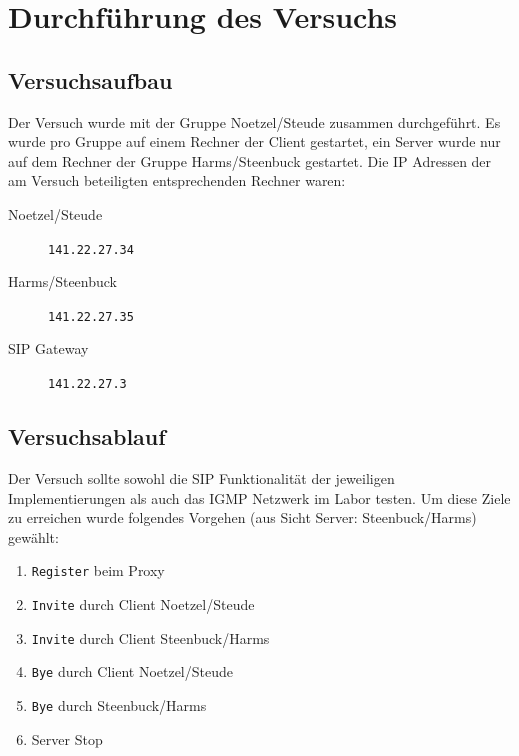 \documentclass[10pt]{scrartcl}
\author{André Harms, Oliver Steenbuck}
\title{\titletext}
\date{04.01.2012}
\begin{document}
\maketitle

\setcounter{tocdepth}{3}
\tableofcontents


\section{Durchführung des Versuchs}

\subsection{Versuchsaufbau}\label{subsec:versuchsaufbau}
Der Versuch wurde mit der Gruppe Noetzel/Steude zusammen durchgeführt.
Es wurde pro Gruppe auf einem Rechner der Client gestartet, ein Server wurde nur auf dem Rechner der Gruppe Harms/Steenbuck gestartet. Die IP Adressen der am Versuch beteiligten entsprechenden Rechner waren:
\begin{description}
	\item[Noetzel/Steude] \verb!141.22.27.34!
	\item[Harms/Steenbuck] \verb!141.22.27.35!
	\item[SIP Gateway] \verb!141.22.27.3!
\end{description}

\subsection{Versuchsablauf}
Der Versuch sollte sowohl die SIP Funktionalität der jeweiligen Implementierungen als auch das IGMP Netzwerk im Labor testen. Um diese Ziele zu erreichen wurde folgendes Vorgehen (aus Sicht Server: Steenbuck/Harms) gewählt:

\begin{enumerate}
	\item \verb!Register! beim Proxy
	\item \verb!Invite! durch Client Noetzel/Steude
	\item \verb!Invite! durch Client Steenbuck/Harms
	\item \verb!Bye! durch Client Noetzel/Steude
	\item \verb!Bye! durch Steenbuck/Harms
	\item Server Stop
\end{enumerate}
\end{document}
